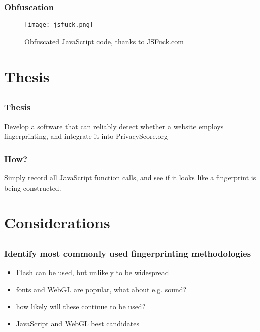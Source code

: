 \documentclass{beamer}
\begin{document}

\begin{frame}
    \frametitle{Obfuscation}
    \begin{figure}[h]
    \centering
    \texttt{[image: jsfuck.png]}
    \caption{Obfuscated JavaScript code, thanks to JSFuck.com}
    \end{figure}
\end{frame}


\section{Thesis}
\subsection{}


\begin{frame}
    \frametitle{Thesis}
    Develop a software that can reliably detect whether a website employs fingerprinting,
    and integrate it into PrivacyScore.org
\end{frame}


\begin{frame}
    \frametitle{How?}
    Simply record all JavaScript function calls, and see if it looks like a fingerprint is being
    constructed.
\end{frame}


\section{Considerations}
\subsection{}


\begin{frame}
    \frametitle{Identify most commonly used fingerprinting methodologies}
    \begin{itemize}
        \item Flash can be used, but unlikely to be widespread
        \item fonts and WebGL are popular, what about e.g. sound?
        \item how likely will these continue to be used?
        \item JavaScript and WebGL best candidates
    \end{itemize}
\end{frame}
\end{document}
